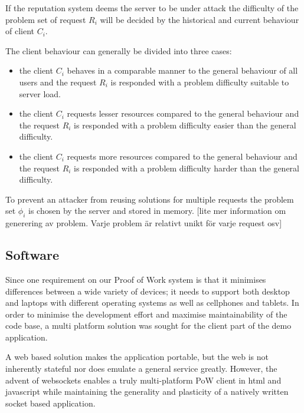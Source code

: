 If the reputation system deems the server to be under attack the difficulty of the problem set of request $R_i$ will be decided by the historical and current behaviour of client $C_i$. 


The client behaviour can generally be divided into three cases:
\begin{itemize}
\item the client $C_i$ behaves in a comparable manner to the general behaviour of all users and the request $R_i$ is responded with a problem difficulty suitable to server load.
\item the client $C_i$ requests lesser resources compared to the general behaviour and the request $R_i$ is responded with a problem difficulty easier than the general difficulty.
\item the client $C_i$ requests more resources compared to the general behaviour and the request $R_i$ is responded with a problem difficulty harder than the general difficulty.
\end{itemize}

To prevent an attacker from reusing solutions for multiple requests the problem set $\phi_i$ is chosen by the server and stored in memory.
[lite mer information om generering av problem. Varje problem är relativt unikt för varje request osv]


\subsection{Software}
Since one requirement on our Proof of Work system is that it minimises differences between a wide variety of devices; it needs to support both desktop and laptops with different operating systems as well as cellphones and tablets.
In order to minimise the development effort and maximise maintainability of the code base, a multi platform solution was sought for the client part of the demo application. 

A web based solution makes the application portable, but the web is not inherently stateful nor does emulate a general service greatly. However, the advent of websockets enables a truly multi-platform PoW client in html and javascript while maintaining the generality and plasticity of a natively written socket based application. 
\begin{comment}
The javascript implementation for handling the protocol is quite simple:
\jscode[firstline=57, firstnumber=57, lastline=84]{../pow.js}
The solution finding part also need to be presented:
\jscode[firstline=26, firstnumber=26, lastline=49]{../pow.js}
To trigger a request to be sent to the server we build the following function which is then registered to the onclick event of a button in the web gui:
\jscode[firstline=100, firstnumber=100, lastline=105]{../pow.js}
\end{comment}

